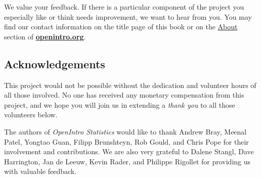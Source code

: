 We value your feedback. If there is a particular component of the project you especially like or think needs improvement, we want to hear from you. You may find our contact information on the title page of this book or on the \href{http://www.openintro.org/about.php}{About} section of \href{http://www.openintro.org}{\color{black}\textbf{openintro.org}}.

\subsection*{Acknowledgements}

This project would not be possible without the dedication and volunteer hours of all those involved. No one has received any monetary compensation from this project, and we hope you will join us in extending a \emph{thank you} to all those volunteers below.

The authors of \textsl{OpenIntro Statistics} would like to thank Andrew Bray, Meenal Patel, Yongtao Guan, Filipp Brunshteyn, Rob Gould, and Chris Pope for their involvement and contributions. %
We are also very grateful to Dalene Stangl, Dave Harrington, Jan de Leeuw, Kevin Rader, and Philippe Rigollet for providing us with valuable feedback.



\begin{comment}

@article{smith1998fifty,
  title={Fifty years of randomised controlled trials},
  author={Smith, R},
  journal={British Medical Journal},
  volume={317},
  pages={1166},
  year={1998}
}

\end{comment}

